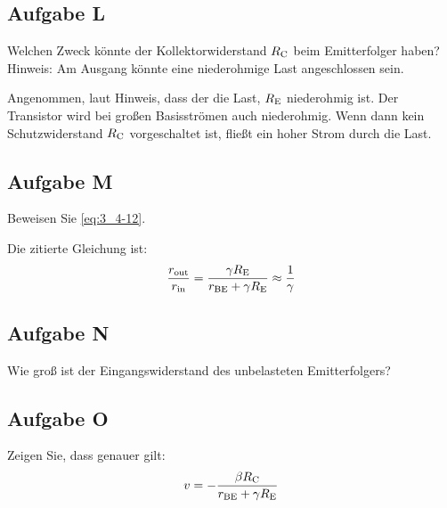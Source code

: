 \FloatBarrier
\subsection{Aufgabe L}

\begin{problem}
	Welchen Zweck könnte der Kollektorwiderstand $R_\text{C}$ beim Emitterfolger
	haben? Hinweis: Am Ausgang könnte eine niederohmige Last angeschlossen
	sein.
\end{problem}

Angenommen, laut Hinweis, dass der die Last, $R_\text{E}$ niederohmig ist. Der
Transistor wird bei großen Basisströmen auch niederohmig. Wenn dann kein
Schutzwiderstand $R_\text{C}$ vorgeschaltet ist, fließt ein hoher Strom durch die
Last.

\FloatBarrier
\subsection{Aufgabe M}

\begin{problem}
	Beweisen Sie \eqref{eq:3_4-12}.
\end{problem}

Die zitierte Gleichung ist:
\begin{equation}
	\label{eq:3_4-12}
	\frac{r_\text{out}}{r_\text{in}}
	= \frac{\gamma R_\text{E}}{r_\text{BE} + \gamma R_\text{E}}
	\approx \frac 1\gamma
\end{equation}

\fehlt

\FloatBarrier
\subsection{Aufgabe N}

\begin{problem}
	Wie groß ist der Eingangswiderstand des unbelasteten Emitterfolgers?
\end{problem}

\fehlt

\FloatBarrier
\subsection{Aufgabe O}

\begin{problem}
	Zeigen Sie, dass genauer gilt:
	\begin{equation}
		\label{eq:3_4-14}
		v = - \frac{\beta R_\text{C}}{r_\text{BE} + \gamma R_\text{E}}
	\end{equation}
\end{problem}

